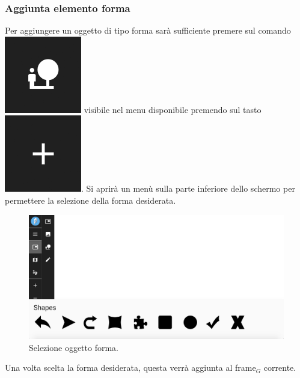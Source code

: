 \subsubsection{Aggiunta elemento forma}
Per aggiungere un oggetto di tipo forma sarà sufficiente premere sul comando \includegraphics[scale=0.4]{img/add_shape.png} visibile nel menu disponibile premendo sul tasto \includegraphics[scale=0.4]{img/add_object.png}. Si aprirà un menù sulla parte inferiore dello schermo per permettere la selezione della forma desiderata.\\
\begin{figure}[h]
\begin{center}
\includegraphics[scale=0.35]{img/sel_shape.png}
\caption{Selezione oggetto forma.}
\end{center}
\end{figure}

Una volta scelta la forma desiderata, questa verrà aggiunta al frame$_G$ corrente.

